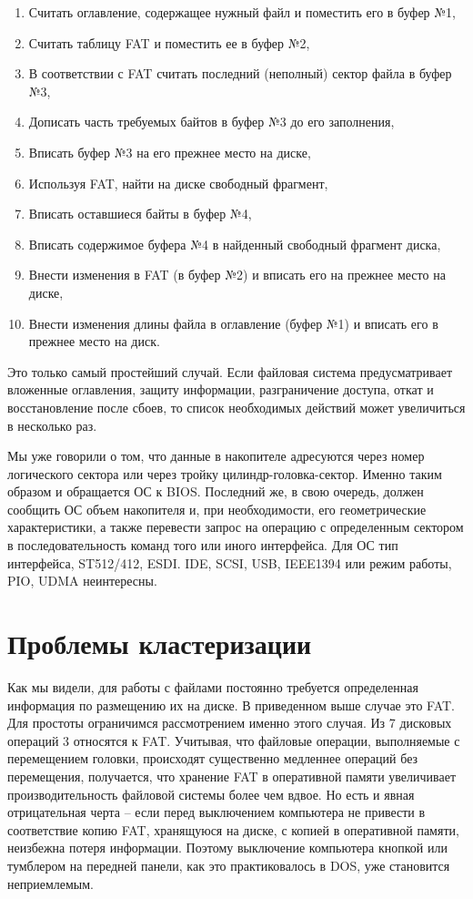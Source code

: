 \documentclass[bachelor, och, referat]{SCWorks}
\begin{document}
\begin{enumerate}
    \item Считать оглавление, содержащее нужный файл и поместить его в буфер №1,
    \item Считать таблицу FAT и поместить ее в буфер №2,
    \item В соответствии с FAT считать последний (неполный) сектор файла в буфер №3,
    \item Дописать часть требуемых байтов в буфер №3 до его заполнения,
    \item Вписать буфер №3 на его прежнее место на диске,
    \item Используя FAT, найти на диске свободный фрагмент,
    \item Вписать оставшиеся байты в буфер №4,
    \item Вписать содержимое буфера №4 в найденный свободный фрагмент диска,
    \item Внести изменения в FAT (в буфер №2) и вписать его на прежнее место на диске,
    \item Внести изменения длины файла в оглавление (буфер №1) и вписать его в прежнее место на диск.
\end{enumerate}

Это только самый простейший случай. Если файловая система предусматривает вложенные оглавления, защиту информации, разграничение доступа, откат и восстановление после сбоев, то список необходимых действий может увеличиться в несколько раз.

Мы уже говорили о том, что данные в накопителе адресуются через номер логического сектора или через тройку цилиндр-головка-сектор. Именно таким образом и обращается ОС к BIOS. Последний же, в свою очередь, должен сообщить ОС объем накопителя и, при необходимости, его геометрические характеристики, а также перевести запрос на операцию с определенным сектором в последовательность команд того или иного интерфейса. Для ОС тип интерфейса, ST512/412, ESDI. IDE, SCSI, USB, IEEE1394 или режим работы, PIO, UDMA неинтересны.

\section{Проблемы кластеризации}

Как мы видели, для работы с файлами постоянно требуется определенная информация по размещению их на диске. В приведенном выше случае это FAT. Для простоты ограничимся рассмотрением именно этого случая. Из 7 дисковых операций 3 относятся к FAT. Учитывая, что файловые операции, выполняемые с перемещением головки, происходят существенно медленнее операций без перемещения, получается, что хранение FAT в оперативной памяти увеличивает производительность файловой системы более чем вдвое. Но есть и явная отрицательная черта -- если перед выключением компьютера не привести в соответствие копию FAT, хранящуюся на диске, с копией в оперативной памяти, неизбежна потеря информации. Поэтому выключение компьютера кнопкой или тумблером на передней панели, как это практиковалось в DOS, уже становится неприемлемым.
\end{document}
